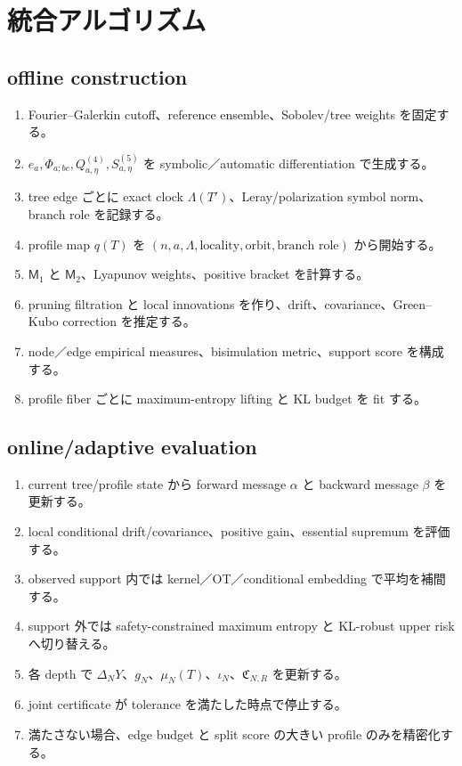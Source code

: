 \documentclass[11pt,a4paper,openany]{book}
\numberwithin{equation}{chapter}
\begin{document}
\chapter{統合アルゴリズム}
\section{offline construction}
\begin{enumerate}
\item Fourier--Galerkin cutoff、reference ensemble、Sobolev/tree weights を固定する。
\item $e_a,\Phi_{a;bc},Q_{a,\eta}^{(4)},S_{a,\eta}^{(5)}$ を symbolic／automatic differentiation で生成する。
\item tree edge ごとに exact clock $\Lambda(T')$、Leray/polarization symbol norm、branch role を記録する。
\item profile map $q(T)$ を $(n,a,\Lambda,\text{locality},\text{orbit},\text{branch role})$ から開始する。
\item $\mathsf M_1$ と $\mathsf M_2$、Lyapunov weights、positive bracket を計算する。
\item pruning filtration と local innovations を作り、drift、covariance、Green--Kubo correction を推定する。
\item node／edge empirical measures、bisimulation metric、support score を構成する。
\item profile fiber ごとに maximum-entropy lifting と KL budget を fit する。
\end{enumerate}

\section{online/adaptive evaluation}
\begin{enumerate}
\item current tree/profile state から forward message $\alpha$ と backward message $\beta$ を更新する。
\item local conditional drift/covariance、positive gain、essential supremum を評価する。
\item observed support 内では kernel／OT／conditional embedding で平均を補間する。
\item support 外では safety-constrained maximum entropy と KL-robust upper risk へ切り替える。
\item 各 depth で $\Delta_NY$、$g_N$、$\mu_N(T)$、$\iota_N$、$\mathfrak C_{N,R}$ を更新する。
\item joint certificate が tolerance を満たした時点で停止する。
\item 満たさない場合、edge budget と split score の大きい profile のみを精密化する。
\end{enumerate}
\end{document}
